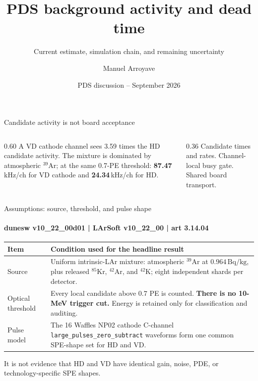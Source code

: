 \documentclass[aspectratio=169,11pt]{beamer}
\title{PDS background activity and dead time}
\subtitle{Current estimate, simulation chain, and remaining uncertainty}
\author{Manuel Arroyave}
\date{PDS discussion -- September 2026}
\newcommand{\rate}[1]{\textbf{#1}\,kHz/ch}
\begin{document}
\begin{frame}[plain]
  \titlepage
\end{frame}

\begin{frame}{Candidate activity is not board acceptance}
  \begin{columns}[T,onlytextwidth]
    \begin{column}{0.60\textwidth}
        {A VD cathode channel sees 3.59 times the HD candidate activity.}
        {The mixture is dominated by atmospheric \(^{39}\)Ar; at the same 0.7-PE threshold: \rate{87.47} for VD cathode and \rate{24.34} for HD.}
    \end{column}
    \begin{column}{0.36\textwidth}
        {Candidate times and rates.}
      \smallskip
        {Channel-local busy gate.}
      \smallskip
        {Shared board transport.}
    \end{column}
  \end{columns}

\end{frame}

\begin{frame}{Assumptions: source, threshold, and pulse shape}
  \framesubtitle{dunesw v10\_22\_00d01 \quad | \quad LArSoft v10\_22\_00 \quad | \quad art 3.14.04}
  \footnotesize
  \setlength{\tabcolsep}{4pt}
  \renewcommand{\arraystretch}{1.20}
  \begin{tabular}{@{}p{}p{}@{}}
    \toprule
    Item & Condition used for the headline result \\
    \midrule
    Source & Uniform intrinsic-LAr mixture: atmospheric \(^{39}\)Ar at \(0.964\,\mathrm{Bq/kg}\), plus released \(^{85}\)Kr, \(^{42}\)Ar, and \(^{42}\)K; eight independent shards per detector. \\
    Optical threshold & Every local candidate above \(0.7\) PE is counted. \textbf{There is no 10-MeV trigger cut.} Energy is retained only for classification and auditing. \\
    Pulse model & The 16 Waffles NP02 cathode C-channel \texttt{large\_pulses\_zero\_subtract} waveforms form one common SPE-shape set for HD and VD. \\
    \bottomrule
  \end{tabular}

  \medskip
    {It is not evidence that HD and VD have identical gain, noise, PDE, or technology-specific SPE shapes.}
\end{frame}
\end{document}
